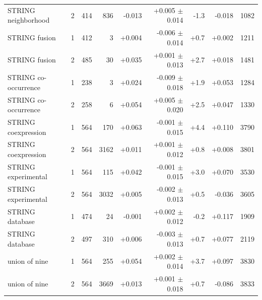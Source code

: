 \begin{table}[H]
\begin{tabular}{@{}lrrrrrrrr@{}}
    STRING neighborhood & 2 & 414 & 836 & -0.013 & +0.005 $\pm$ 0.014 & -1.3 & -0.018 & 1082 \\
    STRING fusion & 1 & 412 & 3 & +0.004 & -0.006 $\pm$ 0.014 & +0.7 & +0.002 & 1211 \\
    STRING fusion & 2 & 485 & 30 & +0.035 & +0.001 $\pm$ 0.013 & +2.7 & +0.018 & 1481 \\
    STRING co-occurrence & 1 & 238 & 3 & +0.024 & -0.009 $\pm$ 0.018 & +1.9 & +0.053 & 1284 \\
    STRING co-occurrence & 2 & 258 & 6 & +0.054 & +0.005 $\pm$ 0.020 & +2.5 & +0.047 & 1330 \\
    STRING coexpression & 1 & 564 & 170 & +0.063 & -0.001 $\pm$ 0.015 & +4.4 & +0.110 & 3790 \\
    STRING coexpression & 2 & 564 & 3162 & +0.011 & +0.001 $\pm$ 0.012 & +0.8 & +0.008 & 3801 \\
    STRING experimental & 1 & 564 & 115 & +0.042 & -0.001 $\pm$ 0.015 & +3.0 & +0.070 & 3530 \\
    STRING experimental & 2 & 564 & 3032 & +0.005 & -0.002 $\pm$ 0.013 & +0.5 & -0.036 & 3605 \\
    STRING database & 1 & 474 & 24 & -0.001 & +0.002 $\pm$ 0.012 & -0.2 & +0.117 & 1909 \\
    STRING database & 2 & 497 & 310 & +0.006 & -0.003 $\pm$ 0.013 & +0.7 & +0.077 & 2119 \\
    union of nine & 1 & 564 & 255 & +0.054 & +0.002 $\pm$ 0.014 & +3.7 & +0.097 & 3830 \\
    union of nine & 2 & 564 & 3669 & +0.013 & +0.001 $\pm$ 0.018 & +0.7 & -0.086 & 3833 \\
    \hline
  \end{tabular}
\end{table}
